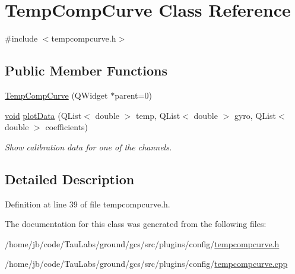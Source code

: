 \hypertarget{class_temp_comp_curve}{\section{\-Temp\-Comp\-Curve \-Class \-Reference}
\label{class_temp_comp_curve}
}


{\ttfamily \#include $<$tempcompcurve.\-h$>$}

\subsection*{\-Public \-Member \-Functions}
\begin{DoxyCompactItemize}
\item 
\hyperlink{group___config_plugin_gadde0ad4527ea2096cecb195d2a635014}{\-Temp\-Comp\-Curve} (\-Q\-Widget $\ast$parent=0)
\item 
\hyperlink{group___u_a_v_objects_plugin_ga444cf2ff3f0ecbe028adce838d373f5c}{void} \hyperlink{group___config_plugin_ga19bcca9caf37d6e7360270c37542d1b5}{plot\-Data} (\-Q\-List$<$ double $>$ temp, \-Q\-List$<$ double $>$ gyro, \-Q\-List$<$ double $>$ coefficients)
\begin{DoxyCompactList}\small\item\em \-Show calibration data for one of the channels. \end{DoxyCompactList}\end{DoxyCompactItemize}


\subsection{\-Detailed \-Description}


\-Definition at line 39 of file tempcompcurve.\-h.



\-The documentation for this class was generated from the following files\-:\begin{DoxyCompactItemize}
\item 
/home/jb/code/\-Tau\-Labs/ground/gcs/src/plugins/config/\hyperlink{tempcompcurve_8h}{tempcompcurve.\-h}\item 
/home/jb/code/\-Tau\-Labs/ground/gcs/src/plugins/config/\hyperlink{tempcompcurve_8cpp}{tempcompcurve.\-cpp}\end{DoxyCompactItemize}
